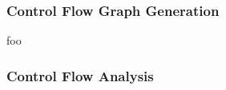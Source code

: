 
\subsubsection{Control Flow Graph Generation}


foo


\subsubsection{Control Flow Analysis}







%

